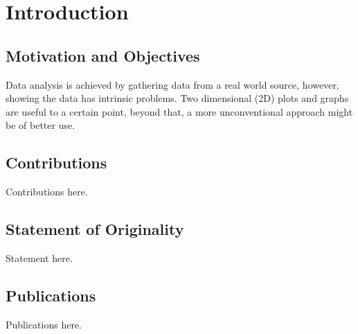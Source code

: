 
\chapter{Introduction}

\section{Motivation and Objectives}

Data analysis is achieved by gathering data from a real world source, however, showing the data has intrinsic problems. Two dimensional (2D) plots and graphs are useful to a certain point, beyond that, a more unconventional approach might be of better use.



\section{Contributions}

Contributions here.


\section{Statement of Originality}

Statement here.


\section{Publications}

Publications here.
